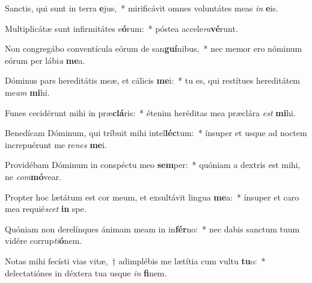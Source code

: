 \item Sanctis, qui sunt in terra \textbf{e}jus,~* mirificávit omnes voluntátes meas \textit{in} \textbf{e}is.
\item Multiplicátæ sunt infirmitátes e\textbf{ó}rum:~* póstea accele\textit{ra}\textbf{vé}runt.
\item Non congregábo conventícula eórum de san\textbf{guí}nibus,~* nec memor ero nóminum eórum per lábi\textit{a} \textbf{me}a.
\item Dóminus pars hereditátis meæ, et cálicis \textbf{me}i:~* tu es, qui restítues hereditátem me\textit{am} \textbf{mi}hi.
\item Funes cecidérunt mihi in præ\textbf{clá}ris:~* étenim heréditas mea præclára \textit{est} \textbf{mi}hi.
\item Benedícam Dóminum, qui tríbuit mihi intel\textbf{léc}tum:~* ínsuper et usque ad noctem increpuérunt me re\textit{nes} \textbf{me}i.
\item Providébam Dóminum in conspéctu meo \textbf{sem}per:~* quóniam a dextris est mihi, ne \textit{com}\textbf{mó}vear.
\item Propter hoc lætátum est cor meum, et exsultávit lingua \textbf{me}a:~* ínsuper et caro mea requié\textit{scet} \textbf{in} spe.
\item Quóniam non derelínques ánimam meam in in\textbf{fér}no:~* nec dabis sanctum tuum vidére corrup\textit{ti}\textbf{ó}nem.
\item Notas mihi fecísti vias vitæ,~† adimplébis me lætítia cum vultu \textbf{tu}o:~* delectatiónes in déxtera tua usque \textit{in} \textbf{fi}nem.
